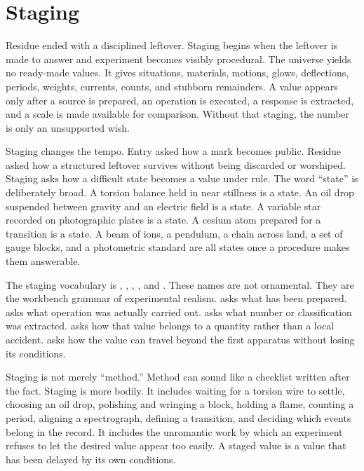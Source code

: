 \chapter{Staging}
\label{chap:staging}

\begin{chapteressay}
Residue ended with a disciplined leftover. Staging begins when the leftover
is made to answer and experiment becomes visibly procedural. The universe yields no ready-made values. It gives situations,
materials, motions, glows, deflections, periods, weights, currents, counts,
and stubborn remainders. A value appears only after a source is prepared, an
operation is executed, a response is extracted, and a scale is made
available for comparison. Without that staging, the number is only an
unsupported wish.

Staging changes the tempo. Entry asked how a mark becomes public. Residue
asked how a structured leftover survives without being discarded or
worshiped. Staging asks how a difficult state becomes a value under rule.
The word ``state'' is deliberately broad. A torsion balance held in near
stillness is a state. An oil drop suspended between gravity and an electric
field is a state. A variable star recorded on photographic plates is a
state. A cesium atom prepared for a transition is a state. A beam of ions,
a pendulum, a chain across land, a set of gauge blocks, and a photometric
standard are all states once a procedure makes them answerable.

The staging vocabulary is , , ,
, and . These names are not ornamental. They
are the workbench grammar of experimental realism.  asks what
has been prepared.  asks what operation was actually carried
out.  asks what number or classification was extracted.
 asks how that value belongs to a quantity rather than a
local accident.  asks how the value can travel beyond the
first apparatus without losing its conditions.

Staging is not merely ``method.'' Method can sound like a checklist written
after the fact. Staging is more bodily. It includes waiting for a torsion
wire to settle, choosing an oil drop, polishing and wringing a block,
holding a flame, counting a period, aligning a spectrograph, defining a
transition, and deciding which events belong in the record. It includes the
unromantic work by which an experiment refuses to let the desired value
appear too easily. A staged value is a value that has been delayed by its
own conditions.


\end{chapteressay}
